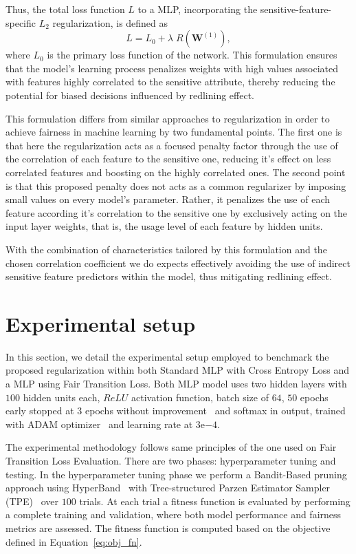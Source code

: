 Thus, the total loss function $L$ to a MLP, incorporating the sensitive-feature-specific $L_2$ regularization, is defined as
\begin{equation}\label{eq:total_regularized_loss}
L = L_0 + \lambda \; R(\mathbf{W}^{(1)}),
\end{equation}
where $L_0$ is the primary loss function of the network. This formulation ensures that the model's learning process penalizes weights with high values associated with features highly correlated to the sensitive attribute, thereby reducing the potential for biased decisions influenced by redlining effect.

This formulation differs from similar approaches to regularization in order to achieve fairness in machine learning by two fundamental points.  The first one is that here the regularization acts as a focused penalty factor through the use of the correlation of each feature to the sensitive one, reducing it's effect on less correlated features and boosting on the highly correlated ones. The second point is that this proposed penalty does not acts as a common regularizer by imposing small values on every model's parameter. Rather, it penalizes the use of each feature according it's correlation to the sensitive one by exclusively acting on the input layer weights, that is, the usage level of each feature by hidden units.

With the combination of characteristics tailored by this formulation and the chosen correlation coefficient we do expects effectively avoiding the use of indirect sensitive feature predictors within the model, thus mitigating redlining effect.

\section{Experimental setup}

In this section, we detail the experimental setup employed to benchmark the proposed regularization within both Standard MLP with Cross Entropy Loss and a MLP using Fair Transition Loss. Both MLP model uses two hidden layers with $100$ hidden units each, $ReLU$ activation function, batch size of $64$, $50$ epochs early stopped at $3$ epochs without improvement~\citep{Li2020} and softmax in output, trained with ADAM optimizer~\citep{KingmaB14} and learning rate at $3\mathrm{e}{-4}$. 

The experimental methodology follows same principles of the one used on Fair Transition Loss Evaluation. There are two phases: hyperparameter tuning and testing. In the hyperparameter tuning phase we perform a Bandit-Based pruning approach using HyperBand~\citep{Li2018} with Tree-structured Parzen Estimator Sampler (TPE)~\citep{bergstra2011} over $100$ trials. At each trial a fitness function is evaluated by performing a complete training and validation, where both model performance and fairness metrics are assessed. The fitness function is computed based on the objective defined in Equation~\ref{eq:obj_fn}. 

